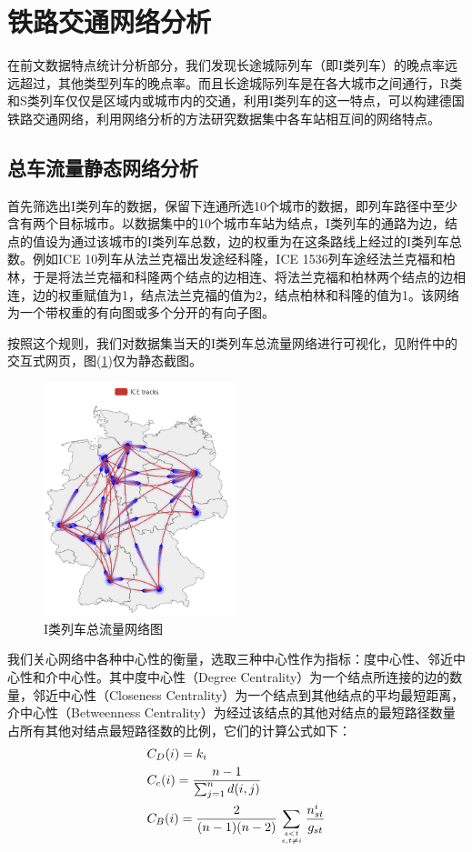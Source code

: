 \documentclass[lang=cn,12pt,a4paper,cite=authoryear]{elegantpaper}
\begin{document}
\section{铁路交通网络分析}

在前文数据特点统计分析部分，我们发现长途城际列车（即I类列车）的晚点率远远超过，其他类型列车的晚点率。而且长途城际列车是在各大城市之间通行，R类和S类列车仅仅是区域内或城市内的交通，利用I类列车的这一特点，可以构建德国铁路交通网络，利用网络分析的方法研究数据集中各车站相互间的网络特点。

\subsection{总车流量静态网络分析}

首先筛选出I类列车的数据，保留下连通所选10个城市的数据，即列车路径中至少含有两个目标城市。以数据集中的10个城市车站为结点，I类列车的通路为边，结点的值设为通过该城市的I类列车总数，边的权重为在这条路线上经过的I类列车总数。例如ICE 10列车从法兰克福出发途经科隆，ICE 1536列车途经法兰克福和柏林，于是将法兰克福和科隆两个结点的边相连、将法兰克福和柏林两个结点的边相连，边的权重赋值为1，结点法兰克福的值为2，结点柏林和科隆的值为1。该网络为一个带权重的有向图或多个分开的有向子图。

按照这个规则，我们对数据集当天的I类列车总流量网络进行可视化，见附件中的交互式网页，图(\ref{fig9})仅为静态截图。

\begin{figure}[H]
	\centering
	\includegraphics[width=0.5\textwidth]{image/graph1.png}
	\caption{I类列车总流量网络图}
	\label{fig9}
\end{figure}

我们关心网络中各种中心性的衡量，选取三种中心性作为指标：度中心性、邻近中心性和介中心性。其中度中心性（Degree Centrality）为一个结点所连接的边的数量，邻近中心性（Closeness Centrality）为一个结点到其他结点的平均最短距离，介中心性（Betweenness Centrality）为经过该结点的其他对结点的最短路径数量占所有其他对结点最短路径数的比例，它们的计算公式如下\citep{easley2010networks}：
\begin{align*}
& C_{D}(i)=k_{i}\\
& C_{c}(i)=\frac{n-1}{\sum_{j=1}^{n} d(i, j)}\\
& C_B(i) = \frac{2}{(n-1)(n-2)} \sum_{s<t \atop s, t \neq i} \frac{n_{s t}^{i}}{g_{s t}}
\end{align*}
\end{document}
